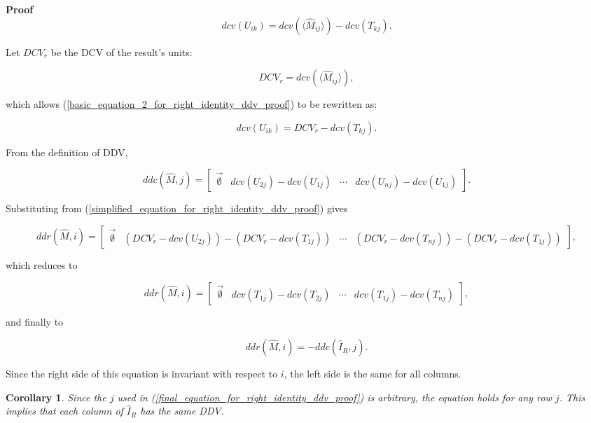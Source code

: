 \documentclass[10pt,letterpaper]{article}
\newtheorem{cor}{Corollary}[section]
\newenvironment{proof}{\noindent\textbf{Proof} }{\qed \newline}
\newcommand{\qed}{\nobreak \ifvmode \relax \else
      \ifdim\lastskip<1.5em \hskip-\lastskip
      \hskip1.5em plus0em minus0.5em \fi \nobreak
      \vrule height0.75em width0.5em depth0.25em\fi}
\numberwithin{equation}{section}
\begin{document}
\begin{proof}
\begin{equation} \label{basic_equation_2_for_right_identity_ddv_proof} dcv(U_{ik}) = dcv( \langle \hat M_{ij} \rangle ) - dcv(T_{kj}). \end{equation}

Let $DCV_r$ be the DCV of the result's units:

\[ DCV_r = dcv( \langle \hat M_{ij} \rangle ) , \]

which allows (\ref{basic_equation_2_for_right_identity_ddv_proof}) to be rewritten as:

\begin{equation} \label{simplified_equation_for_right_identity_ddv_proof} dcv(U_{ik}) = DCV_r - dcv(T_{kj}) . \end{equation}

From the definition of DDV,

\[ ddc(\hat M, j) = \left[ \begin{matrix} \vec{\emptyset} & dcv(U_{2j}) - dcv(U_{1j}) & \cdots & dcv(U_{nj}) - dcv(U_{1j}) \end{matrix} \right] . \]

Substituting from (\ref{simplified_equation_for_right_identity_ddv_proof}) gives

\[ ddr(\hat M, i) = \left[ \begin{matrix} \vec{\emptyset} & (DCV_r - dcv(U_{2j})) - (DCV_r - dcv(T_{1j})) & \cdots & (DCV_r - dcv(T_{nj})) - (DCV_r - dcv(T_{1j})) \end{matrix} \right] , \]

which reduces to

\[ ddr(\hat M, i) = \left[ \begin{matrix} \vec{\emptyset} & dcv(T_{1j}) - dcv(T_{2j}) & \cdots & dcv(T_{1j}) - dcv(T_{nj}) \end{matrix} \right] , \]

and finally to

\begin{equation} \label{final_equation_for_right_identity_ddv_proof} ddr(\hat M, i) = -ddc(\hat I_R, j) . \end{equation} 

Since the right side of this equation is invariant with respect to $i$, the left side is the same for all columns. \end{proof}

\begin{cor}Since the $j$ used in (\ref{final_equation_for_right_identity_ddv_proof}) is arbitrary, the equation holds for any row $j$.  This implies that each column of $\hat I_R$ has the same DDV.\end{cor}
\end{document}
